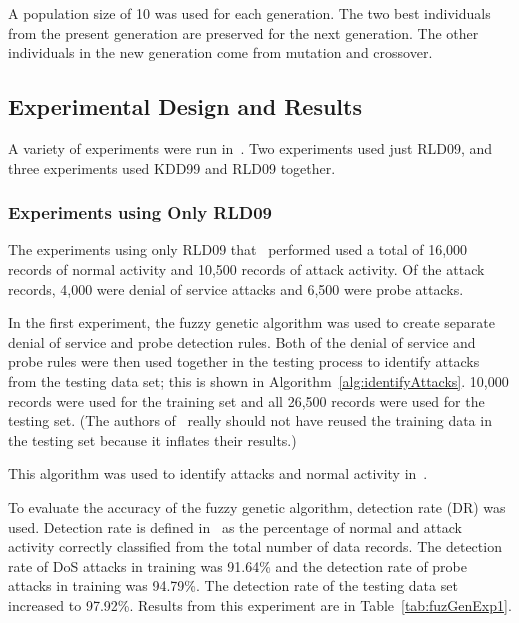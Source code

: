 \documentclass{sig-alternate}
\begin{document}
A population size of 10 was used for each generation. The two best individuals from the present generation are preserved for the next generation. The other individuals in the new generation come from mutation and crossover.



\newpage




\subsection{Experimental Design and Results}
\label{sec:experimentalDesignResults}
A variety of experiments were run in~\cite{6496342, 6559603}. Two experiments used just RLD09, and three experiments used KDD99 and RLD09 together.

\subsubsection{Experiments using Only RLD09}
The experiments using only RLD09 that~\cite{6496342} performed used a total of 16,000 records of normal activity and 10,500 records of attack activity. Of the attack records, 4,000 were denial of service attacks and 6,500 were probe attacks.

In the first experiment, the fuzzy genetic algorithm was used to create separate denial of service and probe detection rules. Both of the denial of service and probe rules were then used together in the testing process to identify attacks from the testing data set; this is shown in Algorithm~\ref{alg:identifyAttacks}. 10,000 records were used for the training set and all 26,500 records were used for the testing set. (The authors of~\cite{6496342} really should not have reused the training data in the testing set because it inflates their results.)

\begin{algorithm}[t]
\caption{This algorithm was used to identify attacks and normal activity in~\cite{6496342}.}
\label{alg:identifyAttacks}
\begin{algorithmic}
\ELSE {}
\ENDIF
\end{algorithmic}
\end{algorithm}

To evaluate the accuracy of the fuzzy genetic algorithm, detection rate (DR) was used. Detection rate is defined in~\cite{6496342, 6559603} as the percentage of normal and attack activity correctly classified from the total number of data records. The detection rate of DoS attacks in training was 91.64\% and the detection rate of probe attacks in training was 94.79\%. The detection rate of the testing data set increased to 97.92\%. Results from this experiment are in Table~\ref{tab:fuzGenExp1}.
\end{document}
